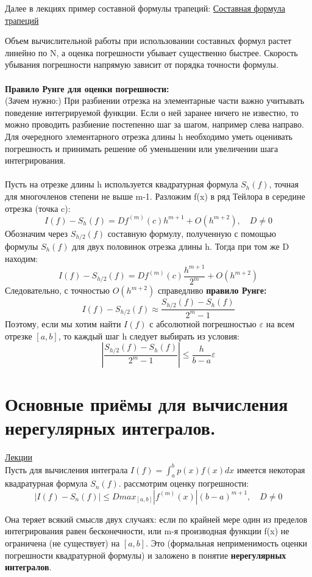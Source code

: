 \documentclass[specialist, subf, href, colorlinks=true, 12pt, times, mtpro, final]{disser}
\theoremstyle{definition}
\begin{document}
     Далее в лекциях пример составной формулы трапеций: \hyperlink {lects.44}{Составная формула трапеций}
     
     Объем вычислительной работы при использовании составных формул растет линейно по N, а оценка погрешности убывает существенно быстрее. Скорость убывания погрешности напрямую зависит от порядка точности формулы.
     \\ \\ 
     \textbf{Правило Рунге для оценки погрешности:}\\
     (Зачем нужно:) При разбиении отрезка на элементарные части важно учитывать поведение интегрируемой функции. Если о ней заранее ничего не известно, то можно проводить разбиение постепенно шаг за шагом, например слева направо. Для очередного элементарного отрезка длины h необходимо уметь оценивать погрешность и принимать решение об уменьшении или увеличении шага интегрирования. 
     \\ \\
     Пусть на отрезке длины h используется квадратурная формула $S_h(f)$, точная для многочленов степени не выше m-1. Разложим f(x) в ряд Тейлора в середине отрезка (точка c):
     $$I(f) - S_h(f) = Df^{(m)}(c)h^{m+1} + O(h^{m+2}), \quad D \not= 0$$ 
     Обозначим через $S_{h/2}(f)$ составную формулу, полученную с помощью формулы $S_h(f)$ для двух половинок отрезка длины h. Тогда при том же D находим:
     $$I(f) - S_{h/2}(f) = Df^{(m)}(c) \frac{h^{m+1}}{2^m} + O(h^{m+2})$$
     Следовательно, с точностью $O(h^{m+2})$ справедливо \textbf{правило Рунге:}
     $$\boxed {I(f) - S_{h/2}(f) \approx \frac{S_{h/2}(f) - S_h(f)}{2^m - 1}}$$
     Поэтому, если мы хотим найти $I(f)$ с абсолютной погрешностью $\varepsilon$ на всем отрезке $[a, b]$, то каждый шаг h следует выбирать из условия:
     $$|\frac{S_{h/2}(f) - S_h(f)}{2^m - 1}| \leq \frac{h}{b-a}\varepsilon$$

\section {Основные приёмы для вычисления нерегулярных интегралов.}
    \hyperlink {lects.45}{Лекции}\\
    Пусть для вычисления интеграла $I(f) = \int_a^b p(x)f(x)dx$ имеется некоторая квадратурная формула $S_n(f)$. рассмотрим оценку погрешности:
    $$|I(f) - S_n(f)| \leq D max_{[a, b]}|f^{(m)}(x)|(b-a)^{m+1}, \quad D \not = 0$$

    Она теряет всякий смыслв двух случаях: если по крайней мере один из пределов интегрирования равен бесконечности, или m-я производная функции f(x) не ограничена (не существует) на $[a, b]$. Это (формальная неприменимость оценки погрешности квадратурной формулы) и заложено в понятие \textbf{нерегулярных интегралов}. 
    
\end{document}
